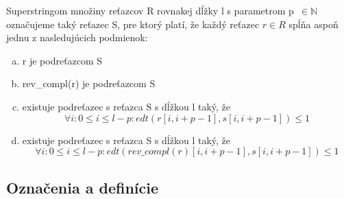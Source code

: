 \begin{defn}
Superstringom množiny reťazcov R rovnakej dĺžky l s parametrom p~$\in \mathbb{N}$ označujeme taký reťazec S, pre ktorý platí, že každý reťazec $r \in R$ spĺňa aspoň jednu z nasledujúcich podmienok:
    \begin{enumerate}[(a)]
    \item r je podreťazcom S
    \item rev\_compl(r) je podreťazcom S
    \item existuje podreťazec s reťazca S s dĺžkou l taký, že 
    $$
    \forall i : 0 \leq i \leq l - p : edt(r[i, i+p-1], s[i, i+p-1]) \leq 1
    $$
    \item existuje podreťazec s reťazca S s dĺžkou l taký, že 
    $$
    \forall i : 0 \leq i \leq l - p : edt(rev\_compl(r)[i, i+p-1], s[i, i+p-1]) \leq 1
    $$    
    \end{enumerate}

\end{defn}


\subsection{Označenia a definície}




